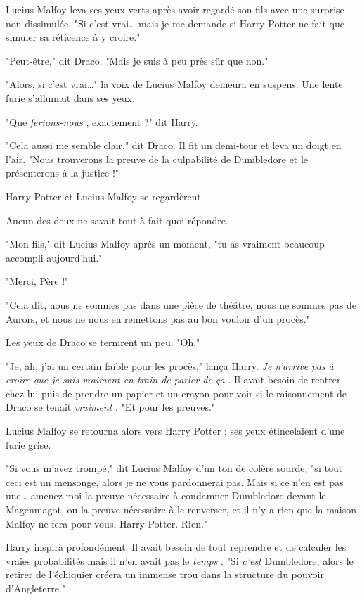 Lucius Malfoy leva ses yeux verts après avoir regardé son fils avec une surprise non dissimulée. "Si c'est vrai… mais je me demande si Harry Potter ne fait que simuler sa réticence à y croire."

"Peut-être," dit Draco. "Mais je suis à peu près sûr que non."

"Alors, si c'est vrai…" la voix de Lucius Malfoy demeura en suspens. Une lente furie s'allumait dans ses yeux.

"Que \emph{ferions-nous} , exactement ?" dit Harry.

"Cela aussi me semble clair," dit Draco. Il fit un demi-tour et leva un doigt en l'air. "Nous trouverons la preuve de la culpabilité de Dumbledore et le présenterons à la justice !"

Harry Potter et Lucius Malfoy se regardèrent.

Aucun des deux ne savait tout à fait quoi répondre.

"Mon fils," dit Lucius Malfoy après un moment, "tu as vraiment beaucoup accompli aujourd'hui."

"Merci, Père !"

"Cela dit, nous ne sommes pas dans une pièce de théâtre, nous ne sommes pas de Aurors, et nous ne nous en remettons pas au bon vouloir d'un procès."

Les yeux de Draco se ternirent un peu. "Oh."

"Je, ah, j'ai un certain faible pour les procès," lança Harry. \emph{Je n'arrive pas à croire que je suis vraiment en train de parler de ça} . Il avait besoin de rentrer chez lui puis de prendre un papier et un crayon pour voir si le raisonnement de Draco se tenait \emph{vraiment} . "Et pour les preuves."

Lucius Malfoy se retourna alors vers Harry Potter ; ses yeux étincelaient d'une furie grise.

"Si vous m'avez trompé," dit Lucius Malfoy d'un ton de colère sourde, "si tout ceci est un mensonge, alors je ne vous pardonnerai pas. Mais si ce n'en est pas une… amenez-moi la preuve nécessaire à condamner Dumbledore devant le Magenmagot, ou la preuve nécessaire à le renverser, et il n'y a rien que la maison Malfoy ne fera pour vous, Harry Potter. Rien."

Harry inspira profondément. Il avait besoin de tout reprendre et de calculer les vraies probabilités mais il n'en avait pas le \emph{temps} . "Si \emph{c'est}  Dumbledore, alors le retirer de l'échiquier créera un immense trou dans la structure du pouvoir d'Angleterre."

